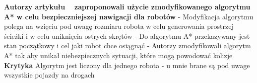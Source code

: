 \newline
\newline
\textbf{Autorzy artykułu ~\cite{elhalawany2013modified} zaproponowali użycie zmodyfikowanego algorytmu A* w celu bezpieczniejszej nawigacji dla robotów}
  \newline
  - Modyfikacja algorytmu polega na wzięciu pod uwagę rozmiaru robota w celu generowania prostrzej ścieżki i w celu uniknięcia ostrych skrętów
  \newline
  - Do algorytmu A* przekazywany jest stan początkowy i cel jaki robot chce osiągnąć
  \newline
  - Autorzy zmodyfikowali algorytm A* tak aby unikał niebezpiecznych sytuacji, które mogą powodować kolizje
\newline
\newline
\textbf{Krytyka}
\newline
 Algorytm jest liczony dla jednego robota - u mnie brane są pod uwage wszystkie pojazdy na drogach


